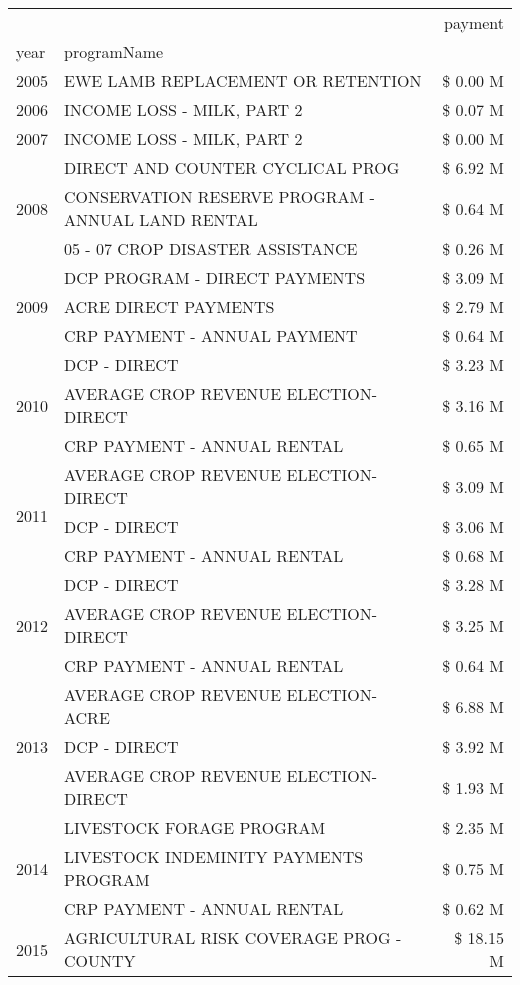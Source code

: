 \begin{tabular}{llr}
\toprule
 &  & payment \\
year & programName &  \\
\midrule
2005 & EWE LAMB REPLACEMENT OR RETENTION & \$ 0.00 M \\
\cline{1-3}
2006 & INCOME LOSS - MILK, PART 2 & \$ 0.07 M \\
\cline{1-3}
2007 & INCOME LOSS - MILK, PART 2 & \$ 0.00 M \\
\cline{1-3}
\multirow[t]{3}{*}{2008} & DIRECT AND COUNTER CYCLICAL PROG & \$ 6.92 M \\
 & CONSERVATION RESERVE PROGRAM - ANNUAL LAND RENTAL & \$ 0.64 M \\
 & 05 - 07 CROP DISASTER ASSISTANCE & \$ 0.26 M \\
\cline{1-3}
\multirow[t]{3}{*}{2009} & DCP PROGRAM - DIRECT PAYMENTS & \$ 3.09 M \\
 & ACRE DIRECT PAYMENTS & \$ 2.79 M \\
 & CRP PAYMENT - ANNUAL PAYMENT & \$ 0.64 M \\
\cline{1-3}
\multirow[t]{3}{*}{2010} & DCP - DIRECT & \$ 3.23 M \\
 & AVERAGE CROP REVENUE ELECTION-DIRECT & \$ 3.16 M \\
 & CRP PAYMENT - ANNUAL RENTAL & \$ 0.65 M \\
\cline{1-3}
\multirow[t]{3}{*}{2011} & AVERAGE CROP REVENUE ELECTION-DIRECT & \$ 3.09 M \\
 & DCP - DIRECT & \$ 3.06 M \\
 & CRP PAYMENT - ANNUAL RENTAL & \$ 0.68 M \\
\cline{1-3}
\multirow[t]{3}{*}{2012} & DCP - DIRECT & \$ 3.28 M \\
 & AVERAGE CROP REVENUE ELECTION-DIRECT & \$ 3.25 M \\
 & CRP PAYMENT - ANNUAL RENTAL & \$ 0.64 M \\
\cline{1-3}
\multirow[t]{3}{*}{2013} & AVERAGE CROP REVENUE ELECTION-ACRE & \$ 6.88 M \\
 & DCP - DIRECT & \$ 3.92 M \\
 & AVERAGE CROP REVENUE ELECTION-DIRECT & \$ 1.93 M \\
\cline{1-3}
\multirow[t]{3}{*}{2014} & LIVESTOCK FORAGE PROGRAM & \$ 2.35 M \\
 & LIVESTOCK INDEMINITY PAYMENTS PROGRAM & \$ 0.75 M \\
 & CRP PAYMENT - ANNUAL RENTAL & \$ 0.62 M \\
\cline{1-3}
\multirow[t]{3}{*}{2015} & AGRICULTURAL RISK COVERAGE PROG - COUNTY & \$ 18.15 M \\

\end{tabular}
